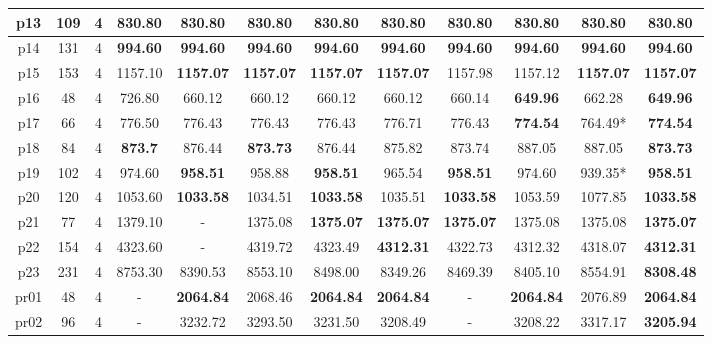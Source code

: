 \begin{table}[h!]
\begin{tabular}{|c|c|c|c|c|c|c|c|c|c|c|c|}
    p13      & 109 & 4  & \textbf{830.80}  & \textbf{830.80}  & \textbf{830.80}  & \textbf{830.80}  & \textbf{830.80}  & \textbf{830.80}  & \textbf{830.80}  & \textbf{830.80}  & \textbf{830.80}   \\\hline
    p14      & 131 & 4  & \textbf{994.60}  & \textbf{994.60}  & \textbf{994.60}  & \textbf{994.60}  & \textbf{994.60}  & \textbf{994.60}  & \textbf{994.60}  & \textbf{994.60}  & \textbf{994.60}   \\\hline
    p15      & 153 & 4  & 1157.10 & \textbf{1157.07} & \textbf{1157.07} & \textbf{1157.07} & \textbf{1157.07} & 1157.98 & 1157.12 & \textbf{1157.07} & \textbf{1157.07}  \\\hline
    p16      & 48  & 4  & 726.80  & 660.12  & 660.12  & 660.12  & 660.12  & 660.14  & \textbf{649.96}  & 662.28  & \textbf{649.96}   \\\hline
    p17      & 66  & 4  & 776.50  & 776.43  & 776.43  & 776.43  & 776.71  & 776.43  & \textbf{774.54}  & 764.49*  & \textbf{774.54}   \\\hline
    p18      & 84  & 4  & \textbf{873.7}  & 876.44  & \textbf{873.73}   & 876.44  & 875.82  & 873.74  & 887.05  & 887.05  & \textbf{873.73}   \\\hline
    p19      & 102 & 4  & 974.60  & \textbf{958.51}  & 958.88  & \textbf{958.51}  & 965.54  & \textbf{958.51}   & 974.60  & 939.35*  & \textbf{958.51}   \\\hline
    p20      & 120 & 4  & 1053.60 & \textbf{1033.58} & 1034.51 & \textbf{1033.58} & 1035.51 & \textbf{1033.58} & 1053.59 & 1077.85 & \textbf{1033.58}  \\\hline
    p21      & 77  & 4  & 1379.10 &     -    & 1375.08 & \textbf{1375.07} & \textbf{1375.07} & \textbf{1375.07} & 1375.08 & 1375.08 & \textbf{1375.07}  \\\hline
    p22      & 154 & 4  & 4323.60 &     -    & 4319.72 & 4323.49 & \textbf{4312.31} & 4322.73 & 4312.32 & 4318.07 & \textbf{4312.31}  \\\hline
    p23      & 231 & 4  & 8753.30 & 8390.53 & 8553.10 & 8498.00 & 8349.26 & 8469.39 & 8405.10 & 8554.91 & \textbf{8308.48}  \\\hline
    pr01     & 48  & 4  &    -     & \textbf{2064.84} & 2068.46 & \textbf{2064.84} & \textbf{2064.84} &    -     & \textbf{2064.84} & 2076.89 & \textbf{2064.84}  \\\hline
    pr02     & 96  & 4  &    -     & 3232.72 & 3293.50 & 3231.50 & 3208.49 &    -     & 3208.22 & 3317.17 & \textbf{3205.94}  \\\hline

\end{tabular}
\end{table}
